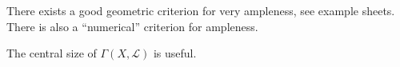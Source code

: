 There exists a good geometric criterion for very ampleness, see example sheets.
There is also a \enquote{numerical} criterion for ampleness.

The central size of $\Gamma(X, \mathcal{L})$ is useful.
